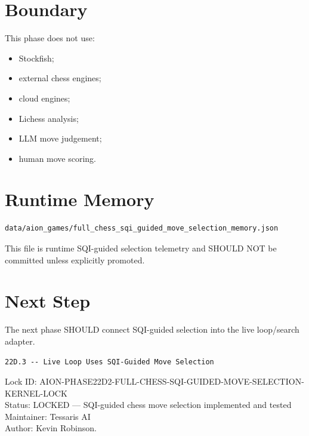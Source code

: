 \documentclass[11pt,a4paper]{article}
\begin{document}
\section{Boundary}

This phase does not use:

\begin{itemize}
  \item Stockfish;
  \item external chess engines;
  \item cloud engines;
  \item Lichess analysis;
  \item LLM move judgement;
  \item human move scoring.
\end{itemize}

\section{Runtime Memory}

\begin{verbatim}
data/aion_games/full_chess_sqi_guided_move_selection_memory.json
\end{verbatim}

This file is runtime SQI-guided selection telemetry and SHOULD NOT be committed unless explicitly promoted.

\section{Next Step}

The next phase SHOULD connect SQI-guided selection into the live loop/search adapter.

\begin{verbatim}
22D.3 -- Live Loop Uses SQI-Guided Move Selection
\end{verbatim}

\bigskip

\noindent
Lock ID: AION-PHASE22D2-FULL-CHESS-SQI-GUIDED-MOVE-SELECTION-KERNEL-LOCK\\
Status: LOCKED --- SQI-guided chess move selection implemented and tested\\
Maintainer: Tessaris AI\\
Author: Kevin Robinson.
\end{document}
